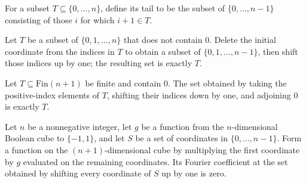 \begin{definition}
\label{FABL.frequencyTail}
\leanok
For a subset $T\subseteq\{0,\ldots,n\}$, define its tail to be the subset of
$\{0,\ldots,n-1\}$ consisting of those $i$ for which $i+1\in T$.
\end{definition}

\begin{theorem}
\label{FABL.tailFrequency_frequencyTail_eq}
\leanok
{}
Let $T$ be a subset of $\{0,1,\ldots,n\}$ that does not contain $0$. Delete the
initial coordinate from the indices in $T$ to obtain a subset of
$\{0,1,\ldots,n-1\}$, then shift those indices up by one; the resulting set is
exactly $T$.
\end{theorem}

\begin{theorem}
\label{FABL.insert_zero_tailFrequency_frequencyTail_eq}
\leanok
{}
Let $T\subseteq\mathrm{Fin}(n+1)$ be finite and contain $0$. The set obtained by taking
the positive-index elements of $T$, shifting their indices down by one, and adjoining
$0$ is exactly $T$.
\end{theorem}

\begin{theorem}
\label{FABL.fourierCoeff_leadingCoordinateTimes_tailFrequency_eq_zero}
\leanok
{}
Let $n$ be a nonnegative integer, let $g$ be a function from the $n$-dimensional Boolean
cube to $\{−1,1\}$, and let $S$ be a set of coordinates in $\{0,\ldots,n-1\}$. Form
a function on the $(n+1)$-dimensional cube by multiplying the first coordinate by $g$
evaluated on the remaining coordinates. Its Fourier coefficient at the set obtained by
shifting every coordinate of $S$ up by one is zero.
\end{theorem}


